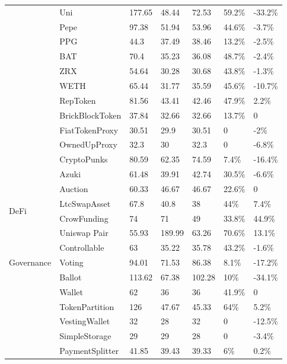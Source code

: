 \begin{table}[t]
{\begin{tabular}{l|l|l|l|l|l|l}
                        & Uni   & 177.65  & 48.44  & 72.53  &  59.2\%   & -33.2\%  \\
                        & Pepe  &  97.38 & 51.94  & 53.96  &  44.6\%  & -3.7\%  \\
                        & PPG   &  44.3 & 37.49  & 38.46  &  13.2\%  &  -2.5\% \\
                        & BAT   & 70.4  & 35.23  & 36.08  & 48.7\%  & -2.4\%  \\
                        & ZRX   & 54.64  & 30.28  & 30.68  & 43.8\%  & -1.3\%  \\
                        & WETH  & 65.44  & 31.77  & 35.59  & 45.6\%  & -10.7\%   \\
                        & RepToken & 81.56 & 43.41  & 42.46  & 47.9\%  & 2.2\%  \\
                        & BrickBlockToken   & 37.84  & 32.66  & 32.66  & 13.7\%  & 0  \\
                        & FiatTokenProxy  & 30.51  & 29.9  & 30.51  & 0  & -2\%  \\
                        & OwnedUpProxy  & 32.3  & 30  & 32.3  & 0  & -6.8\%  \\
                        & CryptoPunks  & 80.59  & 62.35  & 74.59  &  7.4\%  & -16.4\%  \\
                        & Azuki  & 61.48  & 39.91  & 42.74  &  30.5\%  & -6.6\%  \\
\hline
\multirow{4}{*}{DeFi}   & Auction       & 60.33    & 46.67       & 46.67    &    22.6\%      & 0  \\
                        & LtcSwapAsset  & 67.8      & 40.8       & 38      &  44\%      & 7.4\%\\
                        & CrowFunding   & 74   & 71  &  49  & 33.8\%   & 44.9\% \\
                        & Uniswap Pair   &  55.93  & 189.99 &  63.26  & 70.6\%  & 13.1\%  \\
\hline
\multirow{3}{*}{Governance}  & Controllable    & 63     & 35.22      & 35.78   &   43.2\%      & -1.6\%   \\
                             & Voting   & 94.01 & 71.53 & 86.38 & 8.1\% & -17.2\%\\
                             & Ballot   & 113.62 & 67.38  & 102.28 & 10\%  & -34.1\%  \\
\hline
\multirow{5}{*}{}    & Wallet       & 62         & 36       & 36    &  41.9\%  & 0  \\
    {Utility / }     & TokenPartition    & 126   & 47.67       & 45.33   &    64\%        & 5.2\%   \\
 {Token Management}  & VestingWallet       & 32         & 28       & 32     & 0 & -12.5\% \\
                     & SimpleStorage & 29 & 29 & 28 & 0 & -3.4\% \\
                     & PaymentSplitter   & 41.85  & 39.43  & 39.33  & 6\%  & 0.2\%  \\
\hline
\end{tabular}}
\vspace{-1.5em}
\end{table}

